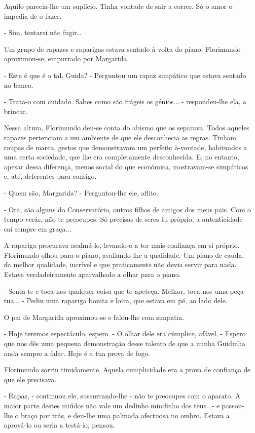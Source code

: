 Aquilo parecia-lhe um suplício. Tinha vontade de sair a correr. Só o
amor o impedia de o fazer.

- Sim, tentarei não fugir\ldots{}

Um grupo de rapazes e raparigas estava sentado à volta do piano.
Florimundo aproximou-se, empurrado por Margarida.

- Este é que é o tal, Guida? - Perguntou um rapaz simpático que estava
sentado no banco.

- Trata-o com cuidado. Sabes como são frágeis os génios... -
respondeu-lhe ela, a brincar.

Nessa altura, Florimundo deu-se conta do abismo que os separava. Todos
aqueles rapazes pertenciam a um ambiente de que ele desconhecia as
regras. Tinham roupas de marca, gestos que demonstravam um perfeito
à-vontade, habituados a uma certa sociedade, que lhe era completamente
desconhecida. E, no entanto, apesar dessa diferença, menos social do que
económica, mostravam-se simpáticos e, até, deferentes para consigo.

- Quem são, Margarida? - Perguntou-lhe ele, aflito.

- Ora, são alguns do Conservatório, outros filhos de amigos dos meus
pais. Com o tempo verás, não te preocupes. Só precisas de seres tu
próprio, a autenticidade cai sempre em graça...

A rapariga procurava acalmá-lo, levando-o a ter mais confiança em si
próprio. Florimundo olhou para o piano, avaliando-lhe a qualidade. Um
piano de cauda, da melhor qualidade, incrível e que praticamente não
devia servir para nada. Estava verdadeiramente aparvalhado a olhar para
o piano.

- Senta-te e toca-nos qualquer coisa que te apeteça. Melhor, toca-nos
uma peça tua... - Pediu uma rapariga bonita e loira, que estava em pé,
ao lado dele.

O pai de Margarida aproximou-se e falou-lhe com simpatia.

- Hoje teremos espectáculo, espero. - O olhar dele era cúmplice, afável.
- Espero que nos dês uma pequena demonstração desse talento de que a
minha Guidinha anda sempre a falar. Hoje é a tua prova de fogo.

Florimundo sorriu timidamente. Aquela cumplicidade era a prova de
confiança de que ele precisava.

- Rapaz, - continuou ele, sussurrando-lhe - não te preocupes com o
aparato. A maior parte destes miúdos não vale um dedinho mindinho dos
teus...- e passou-lhe o braço por trás, e deu-lhe uma palmada afectuosa
no ombro. Estava a aprová-lo ou seria a testá-lo, pensou.

